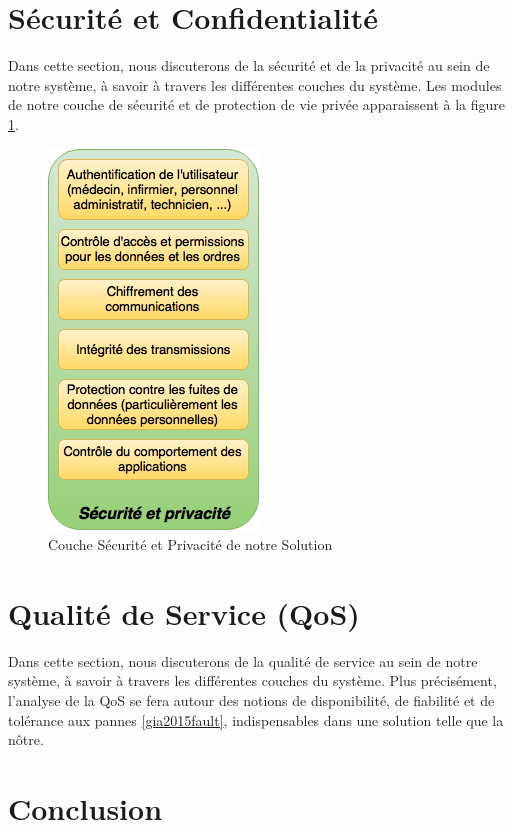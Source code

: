 \documentclass{article}
\begin{document}
\section{Sécurité et Confidentialité}
Dans cette section, nous discuterons de la sécurité et de la privacité au sein de notre système, à savoir à travers les différentes couches du système. Les modules de notre couche de sécurité et de protection de vie privée apparaissent à la figure \ref{securite}.
\newline
\begin{figure}[h!]
	\centering
	\includegraphics[width=0.5\textwidth]{securite.png}
	\caption{Couche Sécurité et Privacité de notre Solution}
	\label{securite}
\end{figure}



\section{Qualité de Service (QoS)}
Dans cette section, nous discuterons de la qualité de service au sein de notre système, à savoir à travers les différentes couches du système. Plus précisément, l'analyse de la QoS se fera autour des notions de disponibilité, de fiabilité et de tolérance aux pannes \ref{gia2015fault}, indispensables dans une solution telle que la nôtre. %


\section{Conclusion}










\end{document}
